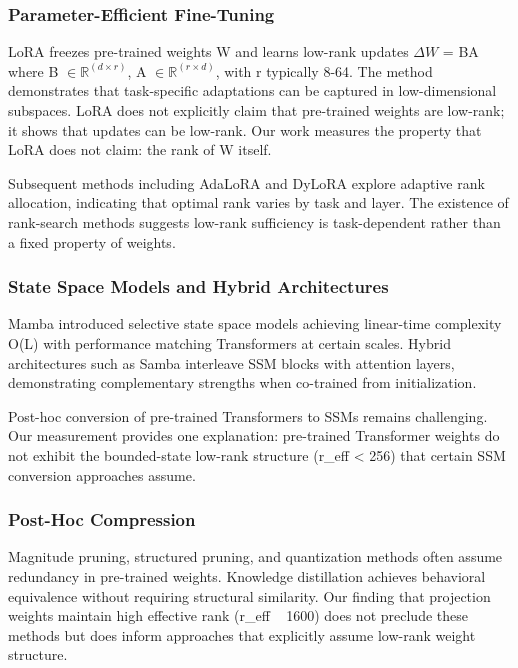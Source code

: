 
\subsubsection{Parameter-Efficient Fine-Tuning}

LoRA freezes pre-trained weights W and learns low-rank updates $\Delta W$ = BA where B $\in \mathbb{R}^(d\times r)$, A $\in \mathbb{R}^(r\times d)$, with r typically 8-64. The method demonstrates that task-specific adaptations can be captured in low-dimensional subspaces. LoRA does not explicitly claim that pre-trained weights are low-rank; it shows that updates can be low-rank. Our work measures the property that LoRA does not claim: the rank of W itself.

Subsequent methods including AdaLoRA and DyLoRA explore adaptive rank allocation, indicating that optimal rank varies by task and layer. The existence of rank-search methods suggests low-rank sufficiency is task-dependent rather than a fixed property of weights.

\subsubsection{State Space Models and Hybrid Architectures}

Mamba introduced selective state space models achieving linear-time complexity O(L) with performance matching Transformers at certain scales. Hybrid architectures such as Samba interleave SSM blocks with attention layers, demonstrating complementary strengths when co-trained from initialization.

Post-hoc conversion of pre-trained Transformers to SSMs remains challenging. Our measurement provides one explanation: pre-trained Transformer weights do not exhibit the bounded-state low-rank structure (r\_eff < 256) that certain SSM conversion approaches assume.

\subsubsection{Post-Hoc Compression}

Magnitude pruning, structured pruning, and quantization methods often assume redundancy in pre-trained weights. Knowledge distillation achieves behavioral equivalence without requiring structural similarity. Our finding that projection weights maintain high effective rank (r\_eff ~ 1600) does not preclude these methods but does inform approaches that explicitly assume low-rank weight structure.
